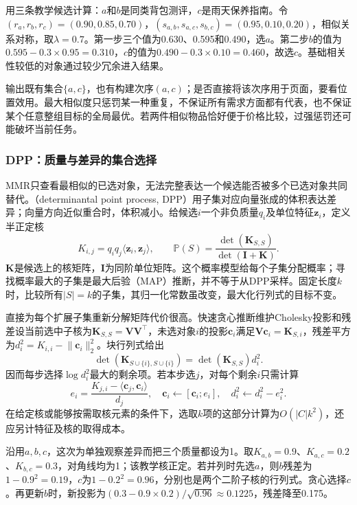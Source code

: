 用三条教学候选计算：$a$和$b$是同类背包测评，$c$是雨天保养指南。令$(r_a,r_b,r_c)=(0.90,0.85,0.70)$，$(s_{a,b},s_{a,c},s_{b,c})=(0.95,0.10,0.20)$，相似关系对称，取$\lambda=0.7$。第一步三个值为0.630、0.595和0.490，选$a$。第二步$b$的值为$0.595-0.3\times0.95=0.310$，$c$的值为$0.490-0.3\times0.10=0.460$，故选$c$。基础相关性较低的对象通过较少冗余进入结果。

输出既有集合$\{a,c\}$，也有构建次序$(a,c)$；是否直接将该次序用于页面，要看位置效用。最大相似度只惩罚某一种重复，不保证所有需求方面都有代表，也不保证某个任意整组目标的全局最优。若两件相似物品恰好便于价格比较，过强惩罚还可能破坏当前任务。

\subsubsection{DPP：质量与差异的集合选择}
\label{sec:rs-dpp}

MMR只查看最相似的已选对象，无法完整表达一个候选能否被多个已选对象共同替代。（determinantal point process, DPP）用子集对应向量张成的体积表达差异；向量方向近似重合时，体积减小。给候选$i$一个非负质量$q_i$及单位特征$\bm z_i$，定义半正定核
\begin{equation}
 K_{i,j}=q_iq_j\langle\bm z_i,\bm z_j\rangle,\qquad
 \mathbb P(S)=\frac{\det(\bm K_{S,S})}{\det(\bm I+\bm K)}.
 \label{eq:rs-dpp}
\end{equation}
$\bm K$是候选上的核矩阵，$\bm I$为同阶单位矩阵。这个概率模型给每个子集分配概率；寻找概率最大的子集是最大后验（MAP）推断，并不等于从DPP采样。固定长度$k$时，比较所有$|S|=k$的子集，其归一化常数虽改变，最大化行列式的目标不变。

直接为每个扩展子集重新分解矩阵代价很高。快速贪心推断维护Cholesky投影和残差设当前选中子核为$\bm K_{S,S}=\bm V\bm V^\top$，未选对象$i$的投影$\bm c_i$满足$\bm V\bm c_i=\bm K_{S,i}$，残差平方为$d_i^2=K_{i,i}-\lVert\bm c_i\rVert_2^2$。块行列式给出
\[
 \det(\bm K_{S\cup\{i\},S\cup\{i\}})
 =\det(\bm K_{S,S})d_i^2.
\]
因而每步选择$\log d_i^2$最大的剩余项。若本步选$j$，对每个剩余$i$只需计算
\begin{equation}
 e_i=\frac{K_{j,i}-\langle\bm c_j,\bm c_i\rangle}{d_j},
 \quad
 \bm c_i\leftarrow[\bm c_i;e_i],
 \quad
 d_i^2\leftarrow d_i^2-e_i^2.
 \label{eq:rs-dpp-update}
\end{equation}
在给定核或能够按需取核元素的条件下，选取$k$项的这部分计算为$O(|C|k^2)$，还应另计特征及核的取得成本。

沿用$a,b,c$，这次为单独观察差异而把三个质量都设为1。取$K_{a,b}=0.9$、$K_{a,c}=0.2$、$K_{b,c}=0.3$，对角线均为1；该教学核正定。若并列时先选$a$，则$b$残差为$1-0.9^2=0.19$，$c$为$1-0.2^2=0.96$，分别也是两个二阶子核的行列式。贪心选择$c$。再更新$b$时，新投影为$(0.3-0.9\times0.2)/\sqrt{0.96}\approx0.1225$，残差降至0.175。

